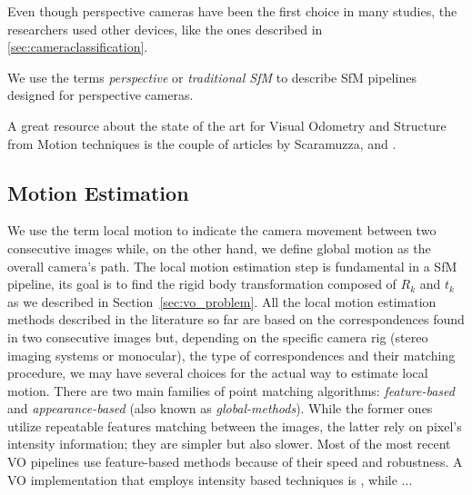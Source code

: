 Even though perspective cameras have been the first choice in many studies, 
the researchers used other devices, like the ones described in 
\ref{sec:cameraclassification}.

We use the terms \textit{perspective} or \textit{traditional SfM} to describe 
SfM pipelines designed for perspective cameras.

A great resource about the state of the art for Visual Odometry and Structure 
from Motion techniques is the couple of articles by Scaramuzza,  
\cite{scaramuzzaVisualOdometryI} and \cite{scaramuzzaVisualOdometryII}.

\subsection{Motion Estimation}
We use the term local motion to indicate the camera movement between two 
consecutive images while, on the other hand, we define global motion as
the overall camera's path.
The local motion estimation step is fundamental in a SfM pipeline, its goal is 
to find the rigid body transformation composed of $R_k$ and $t_k$ as we 
described in Section~\ref{sec:vo_problem}.
All the local motion estimation methods described in the literature so far are 
based on the correspondences found in two consecutive images but, depending on the
specific camera rig (stereo imaging systems or monocular), the type of 
correspondences and their matching procedure, we may have several choices for
the actual way to estimate local motion.
There are two main families of point matching algorithms: \textit{feature-based}
and \textit{appearance-based} (also known as \textit{global-methods}).
While the former ones utilize repeatable features 
matching between the images, the latter rely on pixel's intensity information; 
they are simpler but also slower. Most of the 
most recent VO pipelines use feature-based methods because of
their speed and robustness.
A VO implementation that employs intensity based techniques is 
\cite{nister2004visual}, while ...

